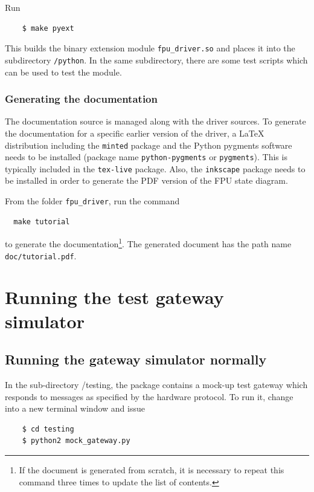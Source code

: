 \documentclass[11pt,a4paper]{scrartcl}
\begin{document}
Run

  \begin{verbatim}
    $ make pyext
  \end{verbatim}    

This builds the binary extension module \verb+fpu_driver.so+
and places it into the subdirectory \verb+/python+.
In the same subdirectory, there are some test
scripts which can be used to test the module.

\subsubsection{Generating the documentation}

The documentation source is managed along with the driver sources.  To
generate the documentation for a specific earlier version of the
driver, a \LaTeX{} distribution including the \texttt{minted} package
and the Python pygments software needs to be installed (package name
\texttt{python-pygments} or \texttt{pygments}).  This is typically
included in the \texttt{tex-live} package. Also, the \texttt{inkscape}
package needs to be installed in order to generate the PDF version of
the FPU state diagram.

From the folder \texttt{fpu\_driver}, run the
command
\begin{verbatim}
  make tutorial
\end{verbatim}
to generate the documentation\footnote{If the document is generated
  from scratch, it is necessary to repeat this command three times to
  update the list of contents.}. The generated document has the path
name \texttt{doc/tutorial.pdf}.


\section{Running the test gateway simulator}
\label{sec:runningthegateway}
\subsection{Running the gateway simulator normally}
In the sub-directory /testing, the package contains a mock-up test
gateway which responds to messages as specified by the hardware
protocol. To run it, change into a new terminal window and
issue

  \begin{verbatim}
    $ cd testing
    $ python2 mock_gateway.py
  \end{verbatim}    
\end{document}
